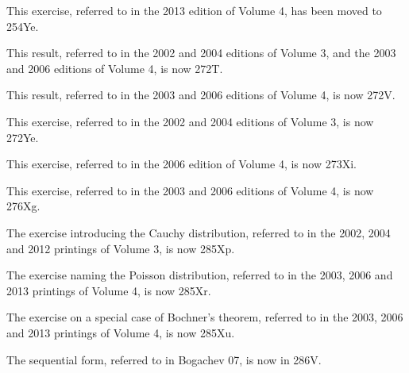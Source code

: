  This exercise, referred to in the 2013
edition of Volume 4, has been moved to 254Ye.

This result, referred to in the 2002 and 2004 editions of Volume 3, 
and the 2003 and 2006 editions of Volume 4, is now 272T.

 This result, referred to in the 2003 and
2006 editions of Volume 4, is now 272V.

 This exercise, referred to in the 2002 and 2004 editions
of Volume 3, is now 272Ye.

 This exercise, referred to in the 2006 edition of Volume
4, is now 273Xi.

 This exercise, referred to in the 2003 and 2006 editions
of Volume 4, is now 276Xg.

 The exercise introducing the
Cauchy distribution, referred to in the 2002, 2004 and 2012 printings of
Volume 3, is now 285Xp.

 The exercise naming the Poisson
distribution, referred to in the 2003, 2006 and 2013 printings of 
Volume 4, is now 285Xr.

 The exercise on a special case of
Bochner's theorem, referred to in the 2003, 2006 and 2013 printings 
of Volume 4, is now 285Xu.

 The sequential form, 
referred to in {\smc Bogachev 07}, is now in 286V.

\fi

